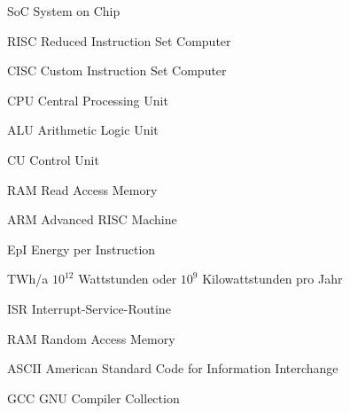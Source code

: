 \begin{abkuerzungen}[MUSTER] %
\item[SoC] System on Chip
\item[RISC] Reduced Instruction Set Computer
\item[CISC] Custom Instruction Set Computer
\item[CPU] Central Processing Unit
\item[ALU] Arithmetic Logic Unit
\item[CU] Control Unit
\item[RAM] Read Access Memory
\item[ARM] Advanced RISC Machine
\item[EpI] Energy per Instruction
\item[TWh/a] $10^{12}$ Wattstunden oder $10^{9}$ Kilowattstunden pro Jahr
\item[ISR] Interrupt-Service-Routine
\item[RAM] Random Access Memory
\item[ASCII] American Standard Code for Information Interchange
\item[GCC] GNU Compiler Collection

\end{abkuerzungen}

